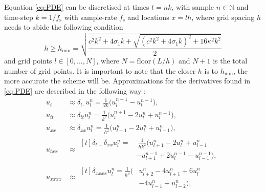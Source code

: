 \documentclass[twoside,a4paper,dvipsnames]{article}
\begin{document}
Equation \eqref{eq:PDE} can be discretised at times $t = nk$, with sample $n \in \mathbb{N}$ and time-step $k = 1 / f_\text{s}$ with sample-rate $f_\text{s}$ and locations $x = lh$, where grid spacing $h$ needs to abide the following condition \cite{Bilbao2009}
\begin{equation}\label{eq:stability}
    h \geq h_\text{min} = \sqrt{\frac{c^2k^2+4 \sigma_1k+\sqrt{(c^2k^2+4\sigma_1k)^2+16\kappa^2k^2}}{2}}
\end{equation}
and grid points $l \in [0,...,N]$, where $N=\text{floor}(L/h)$ and $N + 1$ is the total number of grid points. It is important to note that the closer $h$ is to $h_\text{min}$, the more accurate the scheme will be. 
Approximations for the derivatives found in \eqref{eq:PDE} are described in the following way \cite{Bilbao2009}: 
\begin{subequations}\label{eq:approximations}
    \begin{align}
        \label{eq:centerTime}
        u_{t} &\approx \delta_{t\cdot} u^n_l = \frac{1}{2k}\big(u_l^{n+1}-u_l^{n-1}\big),\\
        \label{eq:secondTime}
        u_{tt} &\approx \delta_{tt}u_l^n = \frac{1}{k^2} \big(u_l^{n+1} - 2u_l^n + u_l^{n-1}\big),\\
        \label{eq:secondSpacex}
        u_{xx} &\approx \delta_{xx}u_l^n = \frac{1}{h^2}\big(u_{l+1}^n - 2u_l^n + u_{l-1}^n\big),\\
        u_{txx} &\approx \label{eq:timeSpace}
        \begin{aligned}[t]\delta_{t-}\delta_{xx}u_l^n =& \; \frac{1}{hk^2}\big(u_{l+1}^n - 2u_l^n + u_{l-1}^n \\
        &- u_{l+1}^{n-1} + 2u_l^{n-1} - u_{l-1}^{n-1}\big),
        \end{aligned}\\
        \label{eq:fourthSpacex}
        u_{xxxx} &\approx\begin{aligned}[t] \delta_{xxxx}u_l^n = \frac{1}{h^4}\big(&u_{l+2}^n - 4u_{l+1}^n + 6u_l^n \\
        &- 4u_{l-1}^n +u_{l-2}^n\big),
        \end{aligned}
    \end{align}
\end{subequations}
\end{document}
